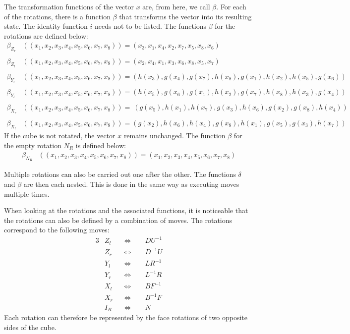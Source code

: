 \documentclass[12pt,a4paper]{article}
\theoremstyle{custom}
\begin{document}
The transformation functions of the vector $x$ are, from here, we call $\beta$. For each of the rotations, there is a function $\beta$ that transforms the vector into its resulting state. The identity function $i$ needs not to be listed. The functions $\beta$ for the rotations are defined below:
\begin{align*}
\beta_{Z_r}  & \left( (x_1, x_2, x_3, x_4, x_5,x_6,x_7,x_8) \right) = (x_3, x_1, x_4, x_2, x_7, x_5, x_8, x_6) \\
\\
\beta_{Z_l}  &   \left( (x_1, x_2, x_3, x_4, x_5,x_6,x_7,x_8) \right)  = (x_2, x_4, x_1, x_3, x_6, x_8, x_5, x_7) \\
\\
\beta_{Y_r}  &  \left( (x_1, x_2, x_3, x_4, x_5,x_6,x_7,x_8)  \right) =  (h(x_3), g(x_4), g(x_7), h(x_8), g(x_1), h(x_2), h(x_5), g(x_6)) \\
\\
\beta_{Y_l}  &   \left( (x_1, x_2, x_3, x_4, x_5,x_6,x_7,x_8) \right)  = (h(x_5), g(x_6), g(x_1), h(x_2),g(x_7),h(x_8),h(x_3),g(x_4)) \\
\\
\beta_{X_r}  &  \left( (x_1, x_2, x_3, x_4, x_5,x_6,x_7,x_8)  \right) = \ (g(x_5), h(x_1), h(x_7), g(x_3), h(x_6), g(x_2), g(x_8),h(x_4)) \\
\\
\beta_{X_l}  &  \left( (x_1, x_2, x_3, x_4, x_5,x_6,x_7,x_8) \right)  =  (g(x_2), h(x_6), h(x_4),g(x_8), h(x_1), g(x_5), g(x_3), h(x_7)) 
\end{align*}
If the cube is not rotated, the vector $x$ remains unchanged. The function $\beta$ for the empty rotation $N_R$ is defined below:
\begin{align*}
\beta_{N_R} & \left( (x_1, x_2, x_3, x_4, x_5,x_6,x_7,x_8) \right) = (x_1, x_2, x_3, x_4, x_5,x_6,x_7,x_8)
\end{align*}

Multiple rotations can also be carried out one after the other. The functions $\delta$ and $\beta$ are then each nested. This is done in the same way as executing moves multiple times.

When looking at the rotations and the associated functions, it is noticeable that the rotations can also be defined by a combination of moves. \newpage The rotations correspond to the following moves:
\begin{alignat*}{3}
& Z_l && \Leftrightarrow \ \ && D U^{-1} \\
& Z_r && \Leftrightarrow && D^{-1} U \\
& Y_l && \Leftrightarrow && L R^{-1} \\
& Y_r && \Leftrightarrow && L^{-1} R \\
& X_l && \Leftrightarrow && B F^{-1} \\
& X_r && \Leftrightarrow && B^{-1} F \\
& I_R && \Leftrightarrow && N
\end{alignat*}
Each rotation can therefore be represented by the face rotations of two opposite sides of the cube.
\end{document}
